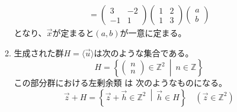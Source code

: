 \documentclass[12pt,b5paper]{ltjsarticle}
\begin{document}
\begin{enumerate}
\begin{enumerate}
\begin{align}
             = \begin{pmatrix}3&-2\\-1&1\end{pmatrix}
             \begin{pmatrix}1 & 2\\1 & 3\end{pmatrix}
             \begin{pmatrix}a\\b\end{pmatrix}
            \end{align}
            となり、$\vec{x}$が定まると$(a,b)$が一意に定まる。
       \item
            生成された群$H=\langle\vec{u}\rangle$は次のような集合である。
            \[
             H=\left\{
            \begin{pmatrix}n\\n\end{pmatrix}
            \in\mathbb{Z}^2
            \ \middle| \
            n\in\mathbb{Z}
            \right\}
            \]
            この部分群における左剰余類%
            は
            次のようなものになる。
            \[
            \vec{z} + H =
             \left\{ \vec{z}+\vec{h}\in\mathbb{Z}^2 \ \middle| \ \vec{h}\in H\right\}
             \quad (\vec{z}\in\mathbb{Z}^2)
            \]


\end{enumerate}
\end{enumerate}
\end{document}

